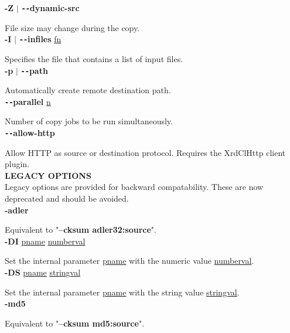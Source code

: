 \documentclass{article}
\begin{document}
		\noindent \textbf{-Z} $\vert$ \textbf{\texttt{-{}-}dynamic-src}

		\noindent File size may change during the copy. \\
		
		\noindent \textbf{-I} $\vert$ \textbf{\texttt{-{}-}infiles} \underline{fn}

		\noindent Specifies the file that contains a list of input files. \\
		
		\noindent \textbf{-p} $\vert$ \textbf{\texttt{-{}-}path}

		\noindent Automatically create remote destination path. \\
		
		\noindent \textbf{\texttt{-{}-}parallel} \underline{n}

		\noindent Number of copy jobs to be run simultaneously. \\
		
		\noindent \textbf{\texttt{-{}-}allow-http}

		\noindent Allow HTTP as source or destination protocol. Requires the XrdClHttp client plugin. \\
		
		\noindent \textbf{LEGACY OPTIONS} \\
		
		\noindent Legacy options are provided for backward compatability. These are now
		deprecated and should be avoided. \\
		
		\noindent \textbf{-adler}

		\noindent Equivalent to "\textbf{--cksum adler32:source}". \\
		
		\noindent \textbf{-DI} \underline{pname} \underline{numberval}

		\noindent Set the internal parameter \underline{pname} with the numeric value \underline{numberval}. \\
		
		\noindent \textbf{-DS} \underline{pname} \underline{stringval}

		\noindent Set the internal parameter \underline{pname} with the string value \underline{stringval}. \\
		
		\noindent \textbf{-md5}

		\noindent Equivalent to "\textbf{--cksum md5:source}". \\
		
\end{document}
